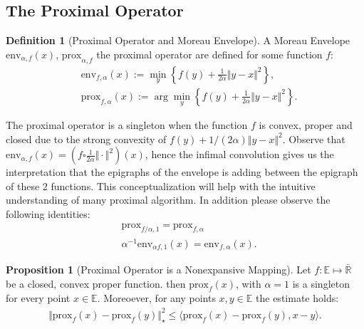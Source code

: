 \documentclass[]{article}
\theoremstyle{definition}
\newtheorem{prop}{Proposition}[section]  %
\newtheorem{definition}{Definition}
\begin{document}
    \subsection{The Proximal Operator}
        \begin{definition}[Proximal Operator and Moreau Envelope]
            A Moreau Envelope $\text{env}_{\alpha, f}(x)$, $\text{prox}_{\alpha, f}$ the proximal operator are defined for some function $f$: 
            $$
            \begin{aligned}
                & \text{env}_{f, \alpha}(x) := \min_{y}\left\lbrace
                    f(y) + \frac{1}{2 \alpha }\Vert y - x\Vert^2
                \right\rbrace, 
                \\
                & \text{prox}_{f, \alpha}(x) := 
                \arg\min_{y}\left\lbrace
                    f(y) + \frac{1}{2\alpha} \Vert y - x\Vert^2
                \right\rbrace. 
            \end{aligned}
            $$
        \end{definition}
        The proximal operator is a singleton when the function $f$ is convex, proper and closed due to the strong convexity of $f(y) + 1/(2\alpha)\Vert y - x\Vert^2$. Observe that $\text{env}_{\alpha, f}(x) = (f\square \frac{1}{2\alpha}\Vert \cdot \Vert^2)(x)$, hence the infimal convolution gives us the interpretation that the epigraphs of the envelope is adding between the epigraph of these 2 functions. This conceptualization will help with the intuitive understanding of many proximal algorithm. 
        In addition please observe the following identities: 
        $$
        \begin{aligned}
            & \text{prox}_{f/\alpha, 1} =  \text{prox}_{f, \alpha}
            \\
            & \alpha^{-1}\text{env}_{\alpha f, 1}(x) = \text{env}_{f, \alpha}(x). 
        \end{aligned}
        $$
        \begin{prop}[Proximal Operator is a Nonexpansive Mapping]
            Let $f:\mathbb E \mapsto \mathbb{\bar R}$ be a closed, convex proper function. then $\text{prox}_f(x)$, with $\alpha= 1$ is a singleton for every point $x\in \mathbb E$. Moreoever, for any points $x, y\in \mathbb E$ the estimate holds: 
            $$
                \begin{aligned}
                    \Vert \text{prox}_f(x) - \text{prox}_f(y)\Vert^2_\star \le 
                    \langle \text{prox}_f(x) - \text{prox}_f(y), x - y\rangle. 
                \end{aligned}
            $$
        \end{prop}
\end{document}
